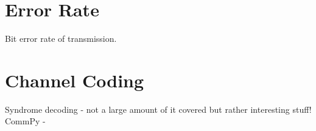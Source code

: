 \documentclass[../main.tex]{subfiles}
\begin{document}

\section{Error Rate}

Bit error rate of transmission.


\section{Channel Coding} \label{sec_Channel Coding}

Syndrome decoding - not a large amount of it covered but rather interesting stuff!
CommPy - \cite{lib_CommPy}
\end{document}
